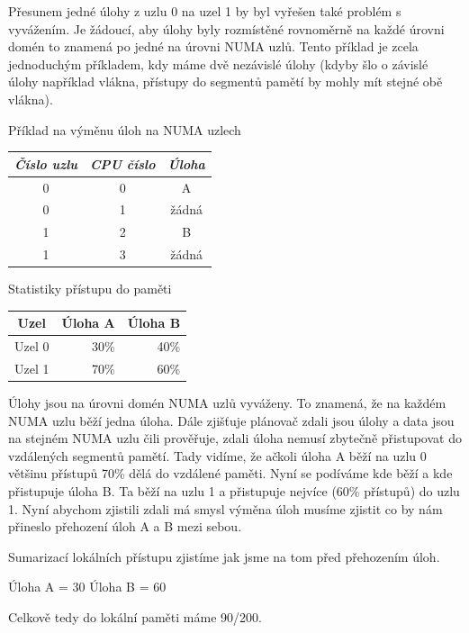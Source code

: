 \documentclass[a4paper,12pt]{article}
\begin{document}
Přesunem jedné úlohy z uzlu 0 na uzel 1 by byl vyřešen také problém s vyvážením. Je žádoucí, aby úlohy byly rozmístěné rovnoměrně na každé úrovni domén to znamená po jedné na úrovni NUMA uzlů. Tento příklad je zcela jednoduchým příkladem, kdy máme dvě nezávislé úlohy (kdyby šlo o závislé úlohy například vlákna, přístupy do segmentů pamětí by mohly mít stejné obě vlákna).

Příklad na výměnu úloh na NUMA uzlech

\begin{table}
\centering

\begin{tabular}{|c|c|c|}
\hline
\emph{Číslo uzlu} & \emph{CPU číslo} & \emph{Úloha} \\
\hline
0 & 0 & A \\
\hline
0 & 1 & žádná  \\
\hline
1 & 2 & B \\
\hline
1 & 3 & žádná \\
\hline
\end{tabular}
\end{table}

Statistiky přístupu do paměti

\begin{table}
\centering

\begin{tabular}{|c|r|r|}
\hline
Uzel & Úloha A & Úloha B \\
\hline
Uzel 0 & 30\% & 40\% \\
\hline
Uzel 1 & 70\% & 60\% \\
\hline
\end{tabular}
\end{table}

Úlohy jsou na úrovni domén NUMA uzlů vyváženy. To znamená, že na každém NUMA uzlu běží jedna úloha. Dále zjišťuje plánovač zdali jsou úlohy a data jsou na stejném NUMA uzlu čili prověřuje, zdali úloha nemusí zbytečně přistupovat do vzdálených segmentů pamětí.  Tady vidíme, že ačkoli úloha A běží na uzlu 0 většinu přístupů 70\% dělá do vzdálené paměti. Nyní se podíváme kde běží a kde přistupuje úloha B. Ta běží na uzlu 1 a přistupuje nejvíce (60\% přístupů) do uzlu 1. Nyní abychom zjistili zdali má smysl výměna úloh musíme zjistit co by nám přineslo přehození úloh A a B mezi sebou.

Sumarizací lokálních přístupu zjistíme jak jsme na tom před přehozením úloh.

Úloha A = 30
Úloha B = 60

Celkově tedy do lokální paměti máme 90/200.
\end{document}
